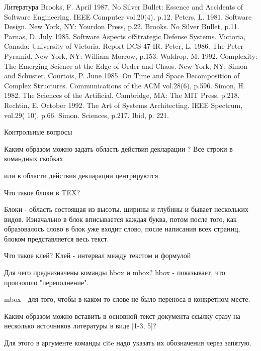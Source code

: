 \documentclass[11pt]{article}
\begin{document}
\begin{thebibliography}{Литература}
 Brooks, F. April 1987. No Silver Bullet: Essence and Accidents of Software Engineering. IEEE Computer vol.20(4), p.12. 
Peters, L. 1981. Software Design. New York, NY: Yourdon Press, p.22. 
 Brooks. No Silver Bullet, p.11. 
Parnas, D. July 1985. Software Aspects ofStrategic Defense Systems. Victoria, Canada: University of Victoria. Report DCS-47-IR. 
Peter, L. 1986. The Peter Pyramid. New York, NY: William Morrow, p.153. 
Waldrop, M. 1992. Complexity: The Emerging Science at the Edge of Order and Chaos. New-York, NY: Simon and Schuster. 
Courtois, P. June 1985. On Time and Space Decomposition of Complex Structures. Communications of the ACM vol.28(6), p.596.
Simon, H. 1982. The Sciences of the Artificial. Cambridge, MA: The MIT Press, p.218. 
Rechtin, E. October 1992. The Art of Systems Architecting. IEEE Spectrum, vol.29( 10), p.66.     
Simon. Sciences, p.217.
Ibid, р. 221.

Контрольные вопросы

Каким образом можно задать область действия декларации \centering?
Все строки в командных скобках \begin{center} \end{center} или в области действия декларации \centering центрируются.

Что такое блоки в TEX?

Блоки - область состоящая из высоты, ширины и глубины и бывает нескольких видов. Изначально в блок вписывается каждая буква, потом после того, как образовалось слово в блок уже входит слово, после написания всех страниц, блоком представляется весь текст. 

Что такое клей?
Клей - интервал между текстом и формулой 

Для чего предназначены команды hbox и mbox? 
hbox - показывает, что произошло "переполнение".

mbox - для того, чтобы в каком-то слове не было переноса в конкретном месте.

Каким образом можно вставить в основной текст документа ссылку сразу на несколько источников литературы в виде [1-3, 5]?

Для этого в аргументе команды сite надо указать их обозначения через запятую.

\end{thebibliography}
\end{document}
